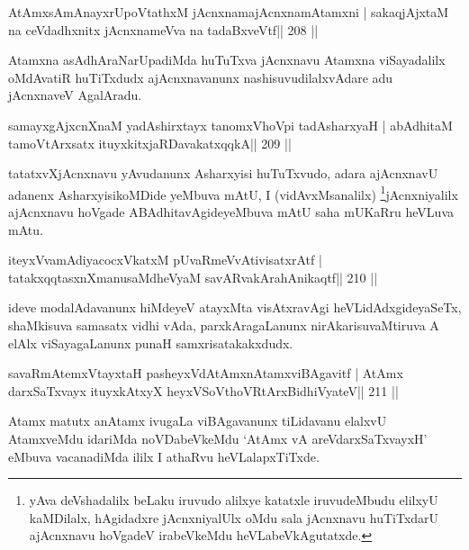\begin{shl}
AtAmxsAmAnayxrUpoVtathxM jAcnxnamajAcnxnamAtamxni |
sakaqjAjxtaM na ceVdadhxnitx jAcnxnameVva na tadaBxveVtf\hfill || 208 ||
\end{shl}

\begin{artha}
Atamxna asAdhAraNarUpadiMda huTuTxva jAcnxnavu Atamxna viSayadalilx \-oMdAvatiR huTiTxdudx ajAcnxnavanunx nashisuvudilalxvAdare adu jAcnxnaveV AgalAradu.
\end{artha}

\begin{shl}
samayxgAjxcnXnaM yadAshirxtayx tanomxVhoV\s pi tadAsharxyaH |
abAdhitaM tamoV\s tArx\s\s satx ituyxkitxjaRDavakatxqqkA\hfill || 209 ||
\end{shl}

\begin{artha}
tatatxvXjAcnxnavu yAvudanunx Asharxyisi huTuTxvudo, adara ajAcnxnavU adanenx AsharxyisikoMDide yeMbuva mAtU, I (vidAvxMsanalilx) \footnote[2]{yAva deVshadalilx beLaku iruvudo alilxye katatxle iruvudeMbudu elilxyU kaMDilalx, hAgidadxre jAcnxniyalUlx oMdu sala jAcnxnavu huTiTxdarU ajAcnxnavu hoVgadeV irabeVkeMdu heVLabeVkAgutatxde.}jAcnxniyalilx ajAcnxnavu hoVgade ABAdhitavAgideyeMbuva mAtU saha mUKaRru heVLuva mAtu.
\end{artha}

\begin{shl}
iteyxVvamAdi\footnotemark[3] yacocxVkatxM pUvaRmeVvAtivisatxrAtf |
tatakxqqtasxnXmanusaMdheVyaM savARva\footnotemark[4]kArahAnikaqtf\hfill || 210 ||
\end{shl}

\begin{artha}
ideve modalAdavanunx hiMdeyeV atayxMta visAtxravAgi heVLidAdxgideyaSeTx, shaMkisuva samasatx vidhi vAda, parxkAragaLanunx nirAkarisuvaMtiruva A elAlx viSayagaLanunx punaH samxrisatakakxdudx.
\end{artha}

\begin{shl}
savaRmAtemxVtayxtaH pasheyxVdAtAmxnAtamxviBAgavitf |
AtAmx darxSaTxvayx ituyxkAtxyX heyxVSoV\s thoVR\s tArxBidhiVyateV\hfill || 211 ||
\end{shl}

\begin{artha}
Atamx matutx anAtamx ivugaLa viBAgavanunx tiLidavanu elalxvU AtamxveMdu idariMda noVDabeVkeMdu `AtAmx vA areVdarxSaTxvayxH' eMbuva vacanadiMda ililx I athaRvu heVLalapxTiTxde.
\end{artha}

